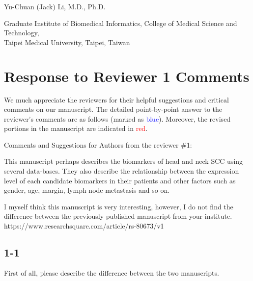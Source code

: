 \documentclass[preprint,12pt]{elsarticle}
\newenvironment{MyColorPar}[1]{%
    \leavevmode\color{#1}\ignorespaces%
}{%
}%
\begin{document}
Yu-Chuan (Jack) Li, M.D., Ph.D.

Graduate Institute of Biomedical Informatics, 
College of Medical Science and Technology,\\
Taipei Medical University,
Taipei, Taiwan


\pagebreak

\section*{Response to Reviewer 1 Comments}
We much appreciate the reviewers for their helpful suggestions and critical comments on our manuscript. The detailed point-by-point answer to the reviewer's comments are as follows (marked as \textcolor{blue}{blue}). 
Moreover, the revised portions in the manuscript are indicated in \textcolor{red}{red}.

Comments and Suggestions for Authors from the reviewer \#1:

This manuscript perhaps describes the biomarkers of head and neck SCC using several data-bases. They also describe the relationship between the expression level of each candidate biomarkers in their patients and other factors such as gender, age, margin, lymph-node metastasis and so on.

I myself think this manuscript is very interesting, however, I do not find the difference between the previously published manuscript from your institute.
https://www.researchsquare.com/article/rs-80673/v1

\subsection*{1-1}
First of all, please describe the difference between the two manuscripts.
\end{document}
